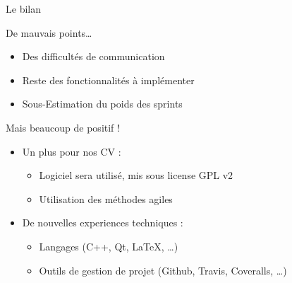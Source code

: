 \CedricSpeak{}
\begin{frame}{Le bilan} %
	\begin{alertblock}{De mauvais points…}
		\begin{itemize}
			\item Des difficultés de communication
			\item Reste des fonctionnalités à implémenter 
			\item Sous-Estimation du poids des sprints 
		\end{itemize}
	\end{alertblock}
	\vfill
	\pause
	\begin{exampleblock}{Mais beaucoup de positif !}
		\begin{itemize}
			\item Un plus pour nos CV :
				\begin{itemize}
					\item Logiciel sera utilisé, mis sous license GPL v2
					\item Utilisation des méthodes agiles
				\end{itemize}
	
			\item De nouvelles experiences techniques :
				\begin{itemize}
					\item Langages (C++, Qt, \LaTeX{}, \ldots)
					\item Outils de gestion de projet (Github, Travis, Coveralls, \ldots)
				\end{itemize}
		\end{itemize}
	\end{exampleblock}

	\vfill
\end{frame}

